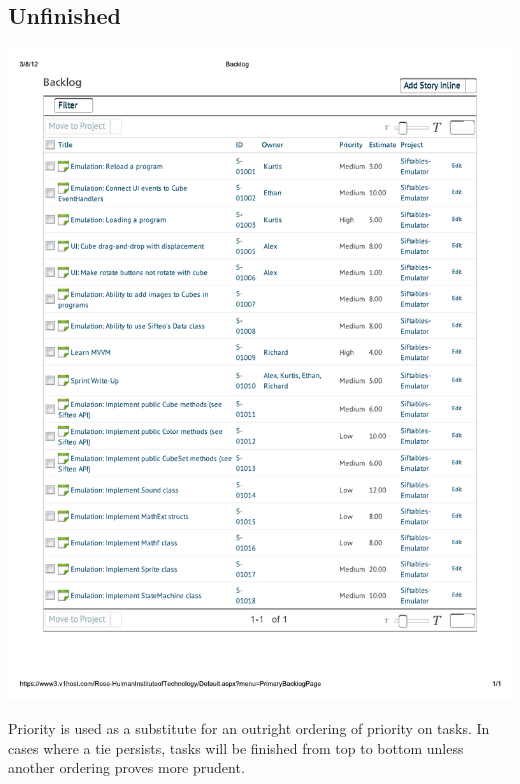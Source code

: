 \documentclass[12pt]{article}
\begin{document}
\subsection*{Unfinished}
\includegraphics[scale=.75]{pdfs/MS1VersionOne/Backlog.pdf}

Priority is used as a substitute for an outright ordering of priority on tasks. In cases where a tie persists, tasks will be finished from top to bottom unless another ordering proves more prudent.
\end{document}
